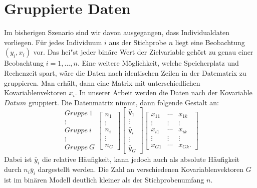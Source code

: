 \documentclass[12pt]{scrreprt}
\begin{document}
	\section{Gruppierte Daten}
	Im bisherigen Szenario sind wir davon ausgegangen, dass Individualdaten vorliegen. Für jedes Individuum $i$ aus der Stichprobe $n$ liegt eine Beobachtung $(y_{i},x_{i})$ vor.  Das hei"st jeder binäre Wert der Zielvariable gehört zu genau einer Beobachtung $i=1,...,n$. Eine weitere Möglichkeit, welche Speicherplatz und Rechenzeit spart, wäre die Daten nach identischen Zeilen in der Datematrix zu gruppieren. Man erhält, dann eine Matrix mit unterschiedlichen Kovariablenvektoren $x_{i}$. In unserer Arbeit werden die Daten nach der Kovariable $Datum$ gruppiert. Die Datenmatrix nimmt, dann folgende Gestalt an:
	\begin{equation}
	\begin{matrix}
	Gruppe ~1 \\
	\vdots \\
	Gruppe ~i \\
	\vdots \\
	Gruppe ~G
	\end{matrix}
	\begin{bmatrix}
	n_{1} \\
	\vdots \\
	n_{i} \\
	\vdots \\
	n_{G}
	\end{bmatrix}
	\begin{bmatrix}
	\bar y_{1} \\
	\vdots \\
	\bar y_{i} \\
	\vdots \\
	\bar y_{G}
	\end{bmatrix}
	\begin{bmatrix}
	x_{11} & \cdots & x_{1k} \\
	\vdots & \vdots & \vdots \\
	x_{i1} & \cdots & x_{ik} \\
	\vdots & \vdots & \vdots \\
	x_{G1} & \cdots & x_{Gk}.
	\end{bmatrix}
	\end{equation}
	Dabei ist $\bar y_{i}$ die relative Häufigkeit, kann jedoch auch als absolute Häufigkeit durch $n_{i}\bar y_{i}$ dargestellt werden. Die Zahl an verschiedenen Kovariablenvektoren $G$ ist im binären Modell deutlich kleiner als der Stichprobenumfang $n$. 
	
\end{document}
